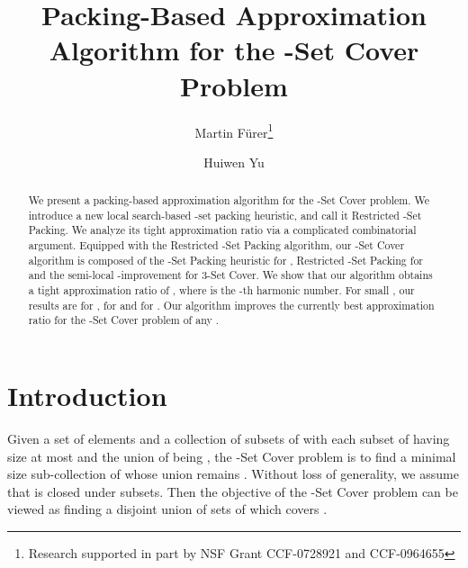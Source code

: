 \documentclass[runningheads,a4paper]{llncs}
\numberwithin{equation}{section}
\begin{document}
\mainmatter
\title{Packing-Based Approximation Algorithm for the -Set Cover Problem}


\author{
Martin F\"{u}rer\thanks{Research supported in part by NSF Grant CCF-0728921 and CCF-0964655} \and Huiwen Yu
}






\date{}
\maketitle



\begin{abstract}
We present a packing-based approximation algorithm for the -Set Cover problem. We introduce a new local search-based -set packing heuristic, and call it Restricted -Set Packing. We analyze its tight approximation ratio via a complicated combinatorial argument. Equipped with the Restricted -Set Packing algorithm, our -Set Cover algorithm is composed of the -Set Packing heuristic \cite{schrijver} for , Restricted -Set Packing for  and the semi-local -improvement \cite{furer} for 3-Set Cover. We show that our algorithm obtains a tight approximation ratio of , where  is the -th harmonic number. For small , our results are  for ,  for  and  for . Our algorithm improves the currently best approximation ratio for the -Set Cover problem of any .

\end{abstract}



\section{Introduction}

Given a set of elements  and a collection of subsets  of  with each subset of  having size at most  and the union of  being , the -Set Cover problem is to find a minimal size sub-collection of  whose union remains . Without loss of generality, we assume that  is closed under subsets. Then the objective of the -Set Cover problem can be viewed as finding a disjoint union of sets of  which covers .
\end{document}

